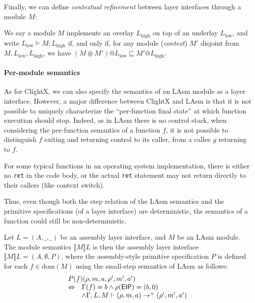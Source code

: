 Finally, we can define \emph{contextual refinement} between layer interfaces through a module $M$:

\begin{definition}
We say a module $M$ implements an overlay $L_{\text{high}}$ on top of an
underlay $L_{\text{low}}$, and write $ L_{\text{low}} \vDash M :
L_{\text{high}} $ if, and only if, for any module (\emph{context}) $M'$ disjoint from $M, L_{\text{low}}, L_{\text{high}}$,
we have $(M \oplus M')@L_{\text{low}} \sqsubseteq M'@L_{\text{high}}$.
\end{definition}

\paragraph{Per-module semantics}
As for ClightX, we can also specify the semantics of an LAsm module as
a layer interface. However, a major difference between ClightX and
LAsm is that it is not possible to uniquely characterize the
``per-function final state'' at which function execution should
stop. Indeed, as in LAsm there is no control stack, when considering
the per-function semantics of a function $f$, it is not possible to
distinguish $f$ exiting and returning control to its caller, from a
callee $g$ returning to $f$. 

For some typical functions in an operating system implementation,
there is either no \verb+ret+ in the code body, or the actual 
\verb+ret+ statement may not return directly to their callers (like context switch).


Thus, even though both the step relation of the LAsm 
semantics and the primitive
specifications (of a layer interface) are deterministic, 
the semantics of a function could still be non-deterministic.

\begin{definition}
Let $L = (A, \_, \_)$ be an
assembly layer interface, and $M$ be an LAsm module. The
module semantics $\llbracket M \rrbracket L$ %
is then the
assembly layer interface $\llbracket M \rrbracket L = (A, \emptyset, P)$,
where the assembly-style primitive specification $P$ is defined for each $f
\in \mathrm{dom}(M)$ using the small-step semantics of LAsm as follows:
\[
\begin{array}{ll}
\multicolumn{2}{l}{P(f)(\rho, m, a, \rho', m', a')} \\
\Leftrightarrow & \Gamma(f) = b \land \rho(\mathsf{EIP}) = (b, 0) \\
& \land \Gamma, L, M \vdash (\rho, m, a) \rightarrow^+ (\rho', m', a')
\end{array}
\]
\end{definition}


